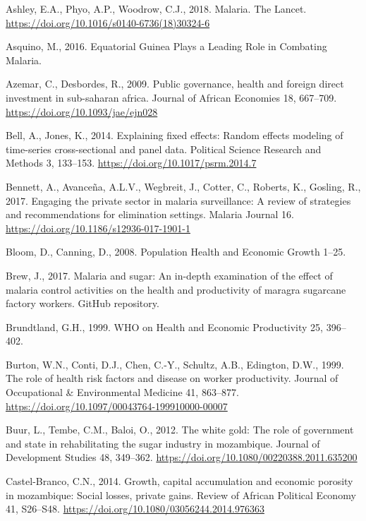 \documentclass[]{article}
\begin{document}
\hypertarget{ref-Ashley2018}{}
Ashley, E.A., Phyo, A.P., Woodrow, C.J., 2018. Malaria. The Lancet.
\url{https://doi.org/10.1016/s0140-6736(18)30324-6}

\hypertarget{ref-asquino2015}{}
Asquino, M., 2016. Equatorial Guinea Plays a Leading Role in Combating
Malaria.

\hypertarget{ref-Azemar2009}{}
Azemar, C., Desbordes, R., 2009. Public governance, health and foreign
direct investment in sub-saharan africa. Journal of African Economies
18, 667--709. \url{https://doi.org/10.1093/jae/ejn028}

\hypertarget{ref-Bell2014}{}
Bell, A., Jones, K., 2014. Explaining fixed effects: Random effects
modeling of time-series cross-sectional and panel data. Political
Science Research and Methods 3, 133--153.
\url{https://doi.org/10.1017/psrm.2014.7}

\hypertarget{ref-Bennett_2017}{}
Bennett, A., Avanceña, A.L.V., Wegbreit, J., Cotter, C., Roberts, K.,
Gosling, R., 2017. Engaging the private sector in malaria surveillance:
A review of strategies and recommendations for elimination settings.
Malaria Journal 16. \url{https://doi.org/10.1186/s12936-017-1901-1}

\hypertarget{ref-Bloom2008}{}
Bloom, D., Canning, D., 2008. Population Health and Economic Growth
1--25.

\hypertarget{ref-brewgit}{}
Brew, J., 2017. Malaria and sugar: An in-depth examination of the effect
of malaria control activities on the health and productivity of maragra
sugarcane factory workers. GitHub repository.

\hypertarget{ref-World1999}{}
Brundtland, G.H., 1999. WHO on Health and Economic Productivity 25,
396--402.

\hypertarget{ref-Burton1999}{}
Burton, W.N., Conti, D.J., Chen, C.-Y., Schultz, A.B., Edington, D.W.,
1999. The role of health risk factors and disease on worker
productivity. Journal of Occupational \& Environmental Medicine 41,
863--877. \url{https://doi.org/10.1097/00043764-199910000-00007}

\hypertarget{ref-Buur2012}{}
Buur, L., Tembe, C.M., Baloi, O., 2012. The white gold: The role of
government and state in rehabilitating the sugar industry in mozambique.
Journal of Development Studies 48, 349--362.
\url{https://doi.org/10.1080/00220388.2011.635200}

\hypertarget{ref-CastelBranco2014}{}
Castel-Branco, C.N., 2014. Growth, capital accumulation and economic
porosity in mozambique: Social losses, private gains. Review of African
Political Economy 41, S26--S48.
\url{https://doi.org/10.1080/03056244.2014.976363}
\end{document}
